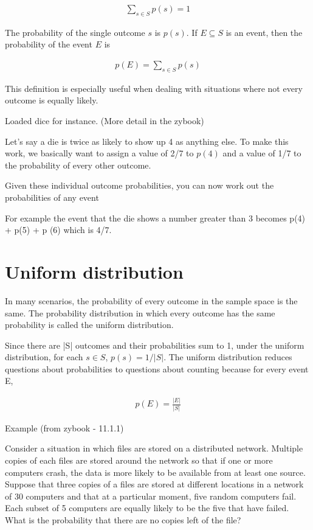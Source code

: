 \documentclass[12pt]{article}
\begin{document}
\begin{align*}
\sum_{s \in S} p(s) = 1
\end{align*}

The probability of the single outcome $s$ is $p(s)$. If $E \subseteq S$ is an event, then the probability of the event $E$ is  

\begin{align*}
p(E) = \sum_{s \in S} p(s) 
\end{align*}

This definition is especially useful when dealing with situations where not every outcome is equally likely. 

Loaded dice for instance. (More detail in the zybook)

Let's say a die is twice as likely to show up 4 as anything else. To make this work, we basically want to assign a value of 2/7 to $p(4)$ and a value of 1/7 to the probability of every other outcome.

Given these individual outcome probabilities, you can now work out the probabilities of any event

For example the event that the die shows a number greater than 3 becomes p(4) + p(5) + p (6) which is 4/7.

\section*{Uniform distribution}

In many scenarios, the probability of every outcome in the sample space is the same. The probability distribution in which every outcome has the same probability is called the uniform distribution. 

Since there are |S| outcomes and their probabilities sum to 1, under the uniform distribution, for each $s \in S$, $p(s) = 1/|S|$. The uniform distribution reduces questions about probabilities to questions about counting because for every event E,

\begin{align*}
p(E) = \frac{|E|}{|S|}
\end{align*}

\pagebreak

Example (from zybook - 11.1.1)

Consider a situation in which files are stored on a distributed network. Multiple copies of each files are stored around the network so that if one or more computers crash, the data is more likely to be available from at least one source. Suppose that three copies of a files are stored at different locations in a network of 30 computers and that at a particular moment, five random computers fail. Each subset of 5 computers are equally likely to be the five that have failed. What is the probability that there are no copies left of the file?
\end{document}
